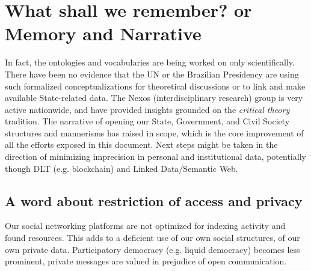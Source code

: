 \documentclass[a4paper]{article}
\begin{document}
\section{What shall we remember? or Memory and Narrative}
In fact, the ontologies and vocabularies are being worked on only scientifically. There have been no evidence that the UN or the Brazilian Presidency are using
such formalized conceptualizations for theoretical discussions or to link and make available State-related data.
The Nexos (interdisciplinary research) group is very active nationwide,
and have provided insights grounded on the \emph{critical theory} tradition.
The narrative of opening our State, Government, and Civil Society structures
and mannerisms has raised in scope, which is the core improvement of all
the efforts exposed in this document.
Next steps might be taken in the direction of minimizing imprecision
in personal and institutional data,
potentially though DLT (e.g. blockchain) and Linked Data/Semantic Web.

\subsection{A word about restriction of access and privacy}
Our social networking platforms are not optimized for indexing activity
and found resources.
This adds to a deficient use of our own social structures,
of our own private data.
Participatory democracy (e.g. liquid democracy) becomes less prominent,
private messages are valued in prejudice of open communication.
\end{document}

